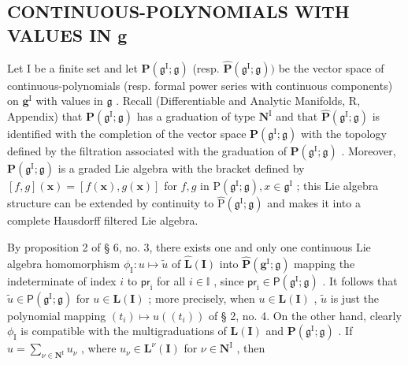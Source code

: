 \subsection{CONTINUOUS-POLYNOMIALS WITH VALUES IN g}

Let I be a finite set and let \(\mathbf{P}(\mathfrak{g}^{\mathrm{I}};\mathfrak{g})\) (resp. \(\hat{\mathbf{P}} (\mathfrak{g}^{\mathrm{I}};\mathfrak{g}))\) be the vector space of continuous-polynomials (resp. formal power series with continuous components) on \(\mathbf{g}^{\mathrm{I}}\) with values in \(\mathfrak{g}\) . Recall (Differentiable and Analytic Manifolds, R, Appendix) that \(\mathbf{P}(\mathfrak{g}^{\mathrm{I}};\mathfrak{g})\) has a graduation of type \(\mathbf{N}^{\mathrm{I}}\) and that \(\hat{\mathbf{P}} (\mathfrak{g}^{\mathrm{I}};\mathfrak{g})\) is identified with the completion of the vector space \(\mathbf{P} (\mathfrak{g}^{\mathrm{I}};\mathfrak{g})\) with the topology defined by the filtration associated with the graduation of \(\mathbf{P}(\mathfrak{g}^{\mathrm{I}};\mathfrak{g})\) . Moreover, \(\mathbf{P}(\mathfrak{g}^{\mathrm{I}};\mathfrak{g})\) is a graded Lie algebra with the bracket defined by \([f,g](\pmb {x}) = [f(\pmb {x}),g(\pmb {x})]\) for \(f, g\) in \(\mathrm{P}(\mathfrak{g}^{\mathrm{I}}; \mathfrak{g}), x \in \mathfrak{g}^{\mathrm{I}}\) ; this Lie algebra structure can be extended by continuity to \(\hat{\mathrm{P}}(\mathfrak{g}^{\mathrm{I}}; \mathfrak{g})\) and makes it into a complete Hausdorff filtered Lie algebra.

By proposition 2 of § 6, no. 3, there exists one and only one continuous Lie algebra homomorphism \(\phi_{\mathrm{I}}:u\mapsto \tilde{u}\) of \(\hat{\mathbf{L}} (\mathbf{I})\) into \(\hat{\mathbf{P}} (\mathbf{g}^{\mathrm{I}};\mathfrak{g})\) mapping the indeterminate of index \(i\) to \(\mathsf{pr}_{\mathrm{i}}\) for all \(i\in \mathbb{I}\) , since \(\mathsf{pr}_{\mathrm{i}}\in \mathsf{P}(\mathfrak{g}^{\mathrm{I}};\mathfrak{g})\) . It follows that \(\tilde{u}\in \mathsf{P}(\mathfrak{g}^{\mathrm{I}};\mathfrak{g})\) for \(u\in \mathbf{L}(\mathbf{I})\) ; more precisely, when \(u\in \mathbf{L}(\mathbf{I})\) , \(\tilde{u}\) is just the polynomial mapping \((t_i)\mapsto u((t_i))\) of § 2, no. 4. On the other hand, clearly \(\phi_{\mathrm{I}}\) is compatible with the multigraduations of \(\mathbf{L}(\mathbf{I})\) and \(\mathbf{P}(\mathfrak{g}^{\mathrm{I}};\mathfrak{g})\) . If \(u = \sum_{\nu \in \mathbf{N}^{\mathrm{I}}}u_{\nu}\) , where \(u_{\nu}\in \mathbf{L}^{\nu}(\mathbf{I})\) for \(\nu \in \mathbf{N}^{\mathrm{I}}\) , then

